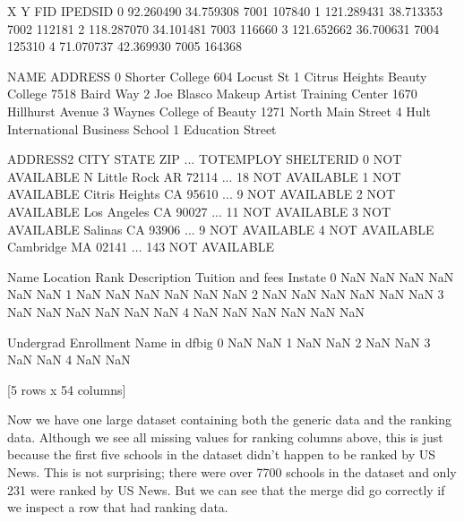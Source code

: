 \documentclass[letterpaper,10pt,english]{sphinxmanual}
\begin{document}
\begin{sphinxVerbatim}[commandchars=\\\{\}]
            X          Y   FID  IPEDSID  \PYGZbs{}
0  \PYGZhy{}92.260490  34.759308  7001   107840   
1 \PYGZhy{}121.289431  38.713353  7002   112181   
2 \PYGZhy{}118.287070  34.101481  7003   116660   
3 \PYGZhy{}121.652662  36.700631  7004   125310   
4  \PYGZhy{}71.070737  42.369930  7005   164368   

                                       NAME                 ADDRESS  \PYGZbs{}
0                           Shorter College           604 Locust St   
1             Citrus Heights Beauty College          7518 Baird Way   
2  Joe Blasco Makeup Artist Training Center   1670 Hillhurst Avenue   
3                  Waynes College of Beauty  1271 North Main Street   
4        Hult International Business School      1 Education Street   

        ADDRESS2            CITY STATE    ZIP  ... TOT\PYGZus{}EMPLOY     SHELTER\PYGZus{}ID  \PYGZbs{}
0  NOT AVAILABLE   N Little Rock    AR  72114  ...         18  NOT AVAILABLE   
1  NOT AVAILABLE  Citris Heights    CA  95610  ...          9  NOT AVAILABLE   
2  NOT AVAILABLE     Los Angeles    CA  90027  ...         11  NOT AVAILABLE   
3  NOT AVAILABLE         Salinas    CA  93906  ...          9  NOT AVAILABLE   
4  NOT AVAILABLE       Cambridge    MA  02141  ...        143  NOT AVAILABLE   

   Name Location  Rank Description  Tuition and fees In\PYGZhy{}state  \PYGZbs{}
0   NaN      NaN   NaN         NaN               NaN      NaN   
1   NaN      NaN   NaN         NaN               NaN      NaN   
2   NaN      NaN   NaN         NaN               NaN      NaN   
3   NaN      NaN   NaN         NaN               NaN      NaN   
4   NaN      NaN   NaN         NaN               NaN      NaN   

   Undergrad Enrollment  Name in df\PYGZus{}big  
0                   NaN             NaN  
1                   NaN             NaN  
2                   NaN             NaN  
3                   NaN             NaN  
4                   NaN             NaN  

[5 rows x 54 columns]
\end{sphinxVerbatim}

Now we have one large dataset containing both the generic data and the ranking data.  Although we see all missing values for ranking columns above, this is just because the first five schools in the dataset didn’t happen to be ranked by US News.  This is not surprising; there were over 7700 schools in the dataset and only 231 were ranked by US News.  But we can see that the merge did go correctly if we inspect a row that had ranking data.
\end{document}
